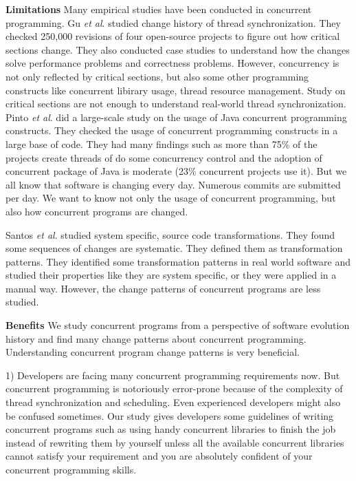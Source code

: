 \textbf{Limitations} Many empirical studies have been conducted in concurrent programming. Gu \textit{et al}. \cite{conf/sigsoft/GuJSZL15} studied change history of thread synchronization. They checked 250,000 revisions of four open-source projects to figure out how critical sections change. They also conducted case studies to understand how the changes solve performance problems and correctness problems. However, concurrency is not only reflected by critical sections, but also some other programming constructs like concurrent libirary usage, thread resource management. Study on critical sections are not enough to understand real-world thread synchronization. Pinto \textit{et al}. \cite{journals/jss/PintoTFFB15} did a large-scale study on the usage of Java concurrent programming constructs. They checked the usage of concurrent programming constructs in a large base of code. They had many findings such as more than 75\% of the projects create threads of do some concurrency control and the adoption of concurrent package of Java is moderate (23\% concurrent projects use it). But we all know that software is changing every day. Numerous commits are submitted per day. We want to know not only the usage of concurrent programming, but also how concurrent programs are changed.

Santos \textit{et al}. \cite{conf/icsm/SantosAEDV15} studied system specific, source code transformations. They found some sequences of changes are systematic. They defined them as transformation patterns. They identified some transformation patterns in real world software and studied their properties like they are system specific, or they were applied in a manual way. However, the change patterns of concurrent programs are less studied.

\textbf{Benefits} We study concurrent programs from a perspective of software evolution history and find many change patterns about concurrent programming. Understanding concurrent program change patterns is very beneficial.

1) Developers are facing many concurrent programming requirements now. But concurrent programming is notoriously error-prone \cite{conf/asplos/LuPSZ08} because of the complexity of thread synchronization and scheduling. Even experienced developers might also be confused sometimes. Our study gives developers some guidelines of writing concurrent programs such as using handy concurrent libraries to finish the job instead of rewriting them by yourself unless all the available concurrent libraries cannot satisfy your requirement and you are absolutely confident of your concurrent programming skills.

